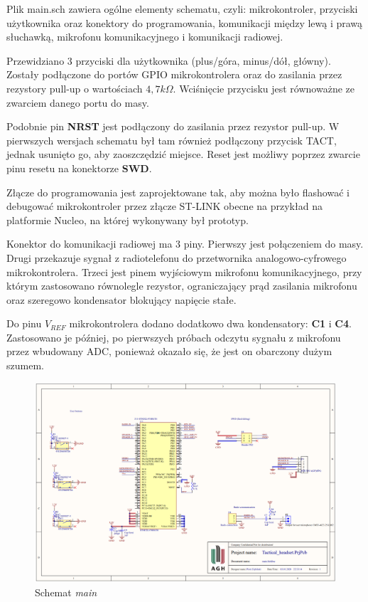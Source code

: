 Plik main.sch zawiera ogólne elementy schematu, czyli: mikrokontroler, przyciski użytkownika oraz konektory do programowania, komunikacji między lewą i prawą słuchawką, mikrofonu komunikacyjnego i komunikacji radiowej.

Przewidziano 3 przyciski dla użytkownika (plus/góra, minus/dół, główny). Zostały podłączone do portów GPIO mikrokontrolera oraz do zasilania przez rezystory pull-up o wartościach $4,7k\Omega$. Wciśnięcie przycisku jest równoważne ze zwarciem danego portu do masy.

Podobnie pin \textbf{NRST} jest podłączony do zasilania przez rezystor pull-up. W pierwszych wersjach schematu był tam również podłączony przycisk TACT, jednak usunięto go, aby zaoszczędzić miejsce. Reset jest możliwy poprzez zwarcie pinu resetu na konektorze \textbf{SWD}.

Złącze do programowania jest zaprojektowane tak, aby można było flashować i debugować mikrokontroler przez złącze ST-LINK obecne na przykład na platformie Nucleo, na której wykonywany był prototyp. 

Konektor do komunikacji radiowej ma 3 piny. Pierwszy jest połączeniem do masy. Drugi przekazuje sygnał z radiotelefonu do przetwornika analogowo-cyfrowego mikrokontrolera. Trzeci jest pinem wyjściowym mikrofonu komunikacyjnego, przy którym zastosowano równolegle rezystor, ograniczający prąd zasilania mikrofonu oraz szeregowo kondensator blokujący napięcie stałe.

Do pinu $V_{REF}$ mikrokontrolera dodano dodatkowo dwa kondensatory: \textbf{C1} i \textbf{C4}. Zastosowano je później, po pierwszych próbach odczytu sygnału z mikrofonu przez wbudowany ADC, ponieważ okazało się, że jest on obarczony dużym szumem.

\begin{figure}[H]
	\centering
	\includegraphics[scale=0.4]{zdjecia/PCB/main.png}
	\caption{\label{main} Schemat \textit{main}}
\end{figure}


